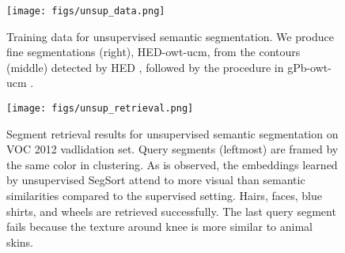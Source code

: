 \documentclass[10pt,twocolumn,letterpaper]{article}
\begin{document}
\begin{figure}
    \centering
    \texttt{[image: figs/unsup\_data.png]}
    \caption{Training data for unsupervised semantic segmentation. We produce fine segmentations (right), HED-owt-ucm, from the contours (middle) detected by HED \cite{xie2015holistically}, followed by the procedure in gPb-owt-ucm \cite{malik2001contour}. }
    \label{fig:unsup_data}
\end{figure}



\begin{table}
  \centering
    \vspace{0.5pt}
    \caption{Quantitative results related to unsupervised semantic segmentation on Pascal VOC 2012 validation set. Our unsupervised trained network (2$^\text{nd}$ row) outperforms the baseline (1$^\text{st}$ row) of directly clustering pretrained features using HED-owt-ucm~\cite{xie2015holistically} and achieves $76\%$ performance of its supervised counterpart (5$^\text{th}$ row). Also, the network fine-tuned from unsupervised pre-trained embeddings (4$^\text{th}$ row) outperforms the one without (3$^\text{rd}$ row) in both mIoU and boundary f-measure.}
    \label{tab:unsupervised}
\end{table}




\begin{figure}
    \centering
    \texttt{[image: figs/unsup\_retrieval.png]}
    \caption{Segment retrieval results for unsupervised semantic segmentation on VOC 2012 vadlidation set. Query segments (leftmost) are framed by the same color in clustering. As is observed, the embeddings learned by unsupervised SegSort attend to more visual than semantic similarities compared to the supervised setting. Hairs, faces, blue shirts, and wheels are retrieved successfully. The last query segment fails because the texture around knee is more similar to animal skins.}
    \label{fig:unsup_retrieval}
    \vspace{-6pt}
\end{figure}
\end{document}
